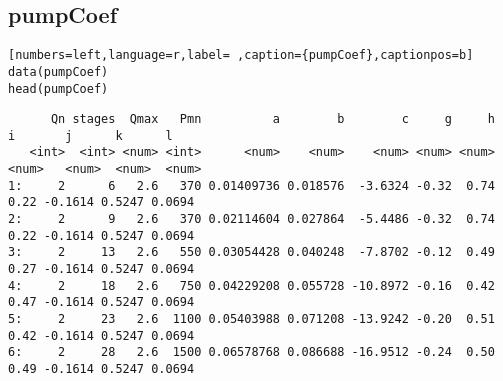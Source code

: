 \subsection{pumpCoef}
\label{sec:org89ccb39}
\begin{lstlisting}[numbers=left,language=r,label= ,caption={pumpCoef},captionpos=b]
data(pumpCoef)
head(pumpCoef)
\end{lstlisting}

\begin{verbatim}
      Qn stages  Qmax   Pmn          a        b        c     g     h     i       j      k      l
   <int>  <int> <num> <int>      <num>    <num>    <num> <num> <num> <num>   <num>  <num>  <num>
1:     2      6   2.6   370 0.01409736 0.018576  -3.6324 -0.32  0.74  0.22 -0.1614 0.5247 0.0694
2:     2      9   2.6   370 0.02114604 0.027864  -5.4486 -0.32  0.74  0.22 -0.1614 0.5247 0.0694
3:     2     13   2.6   550 0.03054428 0.040248  -7.8702 -0.12  0.49  0.27 -0.1614 0.5247 0.0694
4:     2     18   2.6   750 0.04229208 0.055728 -10.8972 -0.16  0.42  0.47 -0.1614 0.5247 0.0694
5:     2     23   2.6  1100 0.05403988 0.071208 -13.9242 -0.20  0.51  0.42 -0.1614 0.5247 0.0694
6:     2     28   2.6  1500 0.06578768 0.086688 -16.9512 -0.24  0.50  0.49 -0.1614 0.5247 0.0694
\end{verbatim}
